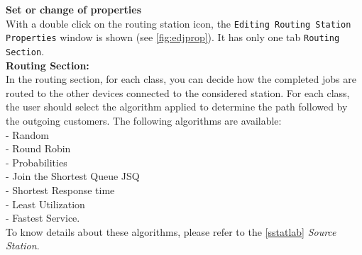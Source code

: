 \noindent \textbf{Set or change of properties}\\ With a double click on the
routing station icon, the \texttt{Editing Routing Station
Properties} window is shown (see \autoref{fig:edjprop}).
It has only one tab \texttt{Routing Section}.\\

\noindent \textbf{Routing Section:}\\ In the routing section, for
each class, you can decide how the completed jobs are routed to
the other devices connected to the considered station.
For each class, the user should select the algorithm applied to
determine the path followed by the outgoing customers.
The following algorithms are available:\\
- Random\\  - Round Robin\\ - Probabilities\\   - Join the Shortest Queue JSQ\\
- Shortest Response time\\ - Least Utilization\\  - Fastest Service.\\

\noindent To know details about these algorithms, please refer to the
\autoref{sstatlab} \emph{Source Station}.

